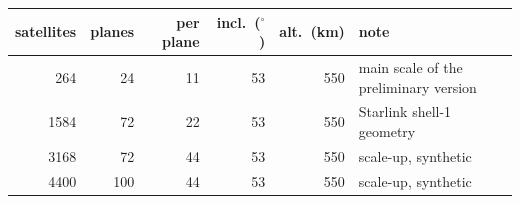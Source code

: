 \begin{tabular}{@{}rrrrrl@{}}
\toprule
satellites & planes & per plane & incl.\ ($^{\circ}$) & alt.\ (km) & note \\
\midrule
264 & 24 & 11 & 53 & 550 & main scale of the preliminary version \\
1584 & 72 & 22 & 53 & 550 & Starlink shell-1 geometry~\cite{starlink} \\
3168 & 72 & 44 & 53 & 550 & scale-up, synthetic \\
4400 & 100 & 44 & 53 & 550 & scale-up, synthetic \\
\bottomrule
\end{tabular}
